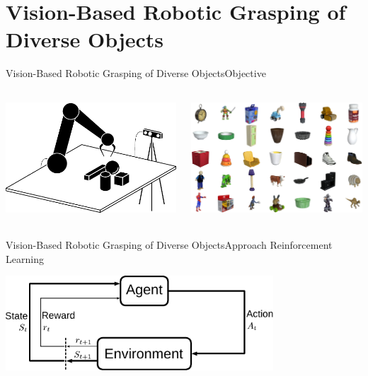 \section{Vision-Based Robotic Grasping of Diverse Objects}

\begin{frame}{Vision-Based Robotic Grasping of Diverse Objects}{Objective}
    \centering
    \begin{columns}%
        \begin{column}{0.5\textwidth}%
            \centering
            \includegraphics[height=4.3cm]{graphics/setup_sketch.pdf}
        \end{column}
        \begin{column}{0.5\textwidth}%
            \centering
            \includegraphics[height=4.3cm]{graphics/training_set.png}
        \end{column}
    \end{columns}
\end{frame}

\begin{frame}{Vision-Based Robotic Grasping of Diverse Objects}{Approach}
    \centering
    {\Large Reinforcement Learning}

    \vspace{0.25cm}

    \includegraphics[width=0.75\textwidth]{graphics/mdp_loop.pdf}
\end{frame}

